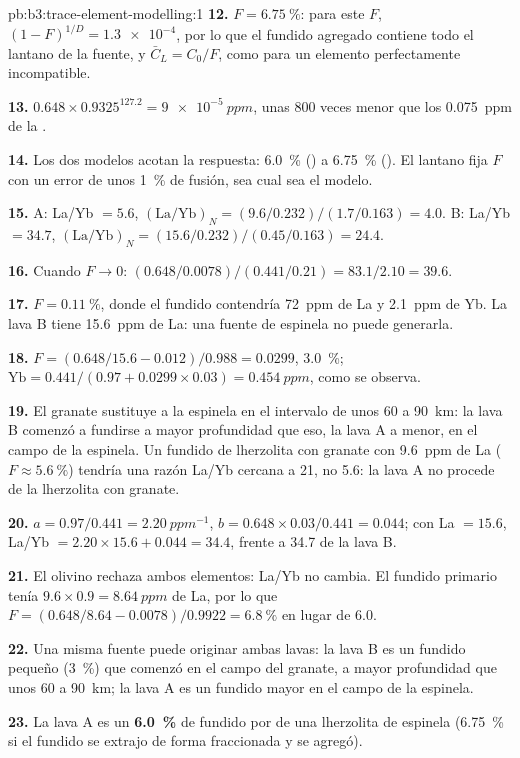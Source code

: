 \begin{solution}{pb:b3:trace-element-modelling:1}
\textbf{12.} $F = \qty{6.75}{\percent}$: para este $F$, $(1 - F)^{1/D} =
\num{1.3e-4}$, por lo que el fundido agregado contiene todo el lantano de la fuente, y
$\bar C_L = C_0/F$, como para un elemento perfectamente incompatible.

\textbf{13.} $0.648\times0.9325^{127.2} = \qty{9e-5}{ppm}$, unas 800 veces
menor que los \qty{0.075}{ppm} de la .

\textbf{14.} Los dos modelos acotan la respuesta: \qty{6.0}{\percent} ()
a \qty{6.75}{\percent} (). El lantano fija $F$ con un error de
unos \qty{1}{\percent} de fusión, sea cual sea el modelo.

\textbf{15.} A: La/Yb $= 5.6$, $(\mathrm{La}/\mathrm{Yb})_N =
(9.6/0.232)/(1.7/0.163) = 4.0$. B: La/Yb $= 34.7$, $(\mathrm{La}/\mathrm{Yb})_N
= (15.6/0.232)/(0.45/0.163) = 24.4$.

\textbf{16.} Cuando $F \to 0$: $(0.648/0.0078)/(0.441/0.21) = 83.1/2.10 = 39.6$.

\textbf{17.} $F = \qty{0.11}{\percent}$, donde el fundido contendría
\qty{72}{ppm} de La y \qty{2.1}{ppm} de Yb. La lava B tiene \qty{15.6}{ppm} de La:
una fuente de espinela no puede generarla.

\textbf{18.} $F = (0.648/15.6 - 0.012)/0.988 = 0.0299$, \qty{3.0}{\percent};
$\mathrm{Yb} = 0.441/(0.97 + 0.0299\times0.03) = \qty{0.454}{ppm}$, como
se observa.

\textbf{19.} El granate sustituye a la espinela en el intervalo de unos 60 a \qty{90}{km}: la lava B
comenzó a fundirse a mayor profundidad que eso, la lava A a menor, en el campo de la espinela. Un fundido de lherzolita con granate
con \qty{9.6}{ppm} de La ($F \approx \qty{5.6}{\percent}$) tendría una razón La/Yb
cercana a 21, no 5.6: la lava A no procede de la lherzolita con granate.

\textbf{20.} $a = 0.97/0.441 = \qty{2.20}{ppm^{-1}}$, $b = 0.648\times0.03/0.441
= 0.044$; con La $= 15.6$, La/Yb $= 2.20\times15.6 + 0.044 = 34.4$, frente a
34.7 de la lava B.

\textbf{21.} El olivino rechaza ambos elementos: La/Yb no cambia. El fundido primario
tenía $9.6\times0.9 = \qty{8.64}{ppm}$ de La, por lo que $F = (0.648/8.64 -
0.0078)/0.9922 = \qty{6.8}{\percent}$ en lugar de 6.0.

\textbf{22.} Una misma fuente puede originar ambas lavas: la lava B es un fundido pequeño
(\qty{3}{\percent}) que comenzó en el campo del granate, a mayor profundidad que unos 60 a
\qty{90}{km}; la lava A es un fundido mayor en el campo de la espinela.

\textbf{23.} La lava A es un \textbf{\qty[text-series-to-math=true]{6.0}{\percent}} de fundido
por  de una lherzolita de espinela (\qty{6.75}{\percent} si el fundido se
extrajo de forma fraccionada y se agregó).
\end{solution}
